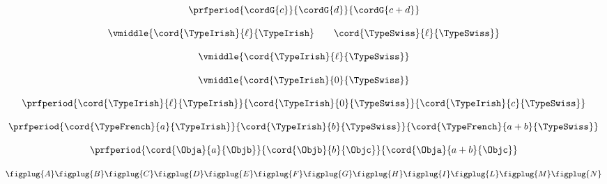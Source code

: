 \begin{forslides}
    \begin{equation}
        \label{eq:semicats-slides-54}
        \prfperiod{
            \cordG{c}
        }{
            \cordG{d}
        }{
            \cordG{c+d}
        }
    \end{equation}

    \begin{equation}
        \label{eq:semicats-slides-55}
        \vmiddle{\cord{\TypeIrish}{\ell}{\TypeIrish} \qquad \cord{\TypeSwiss}{\ell}{\TypeSwiss}}
    \end{equation}

    \begin{equation}
        \label{eq:semicats-slides-56}
        \vmiddle{\cord{\TypeIrish}{\ell}{\TypeSwiss}}
    \end{equation}

    \begin{equation}
        \label{eq:semicats-slides-57}
        \vmiddle{\cord{\TypeIrish}{0}{\TypeSwiss}}
    \end{equation}

    \begin{equation}
        \label{eq:semicats-slides-58a}
        \prfperiod{
            \cord{\TypeIrish}{\ell}{\TypeIrish}
        }{
            \cord{\TypeIrish}{0}{\TypeSwiss}
        }{
            \cord{\TypeIrish}{c}{\TypeSwiss}
        }
    \end{equation}

    \begin{equation}
        \label{eq:semicats-slides-58b}
        \prfperiod{
            \cord{\TypeFrench}{a}{\TypeIrish}
        }{
            \cord{\TypeIrish}{b}{\TypeSwiss}
        }{
            \cord{\TypeFrench}{a + b}{\TypeSwiss}
        }
    \end{equation}

    \begin{equation}
        \label{eq:semicats-slides-59}
        \prfperiod{
            \cord{\Obja}{a}{\Objb}
        }{
            \cord{\Objb}{b}{\Objc}
        }{
            \cord{\Obja}{a+b}{\Objc}
        }
    \end{equation}

    \begin{equation}
        \label{eq:semicats-slides-60}
        \centering
        \figplug{A}
        \figplug{B}
        \figplug{C}
        \figplug{D}
        \figplug{E}
        \figplug{F}
        \figplug{G}
        \figplug{H}
        \figplug{I}
        \figplug{L}
        \figplug{M}
        \figplug{N}
    \end{equation}


\end{forslides}
